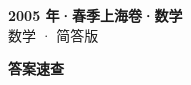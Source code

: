 \documentclass[zihao=-4, a4paper]{ctexart}
\begin{document}
\begin{center}
  {\Large\bfseries 2005 年·春季上海卷·数学}\\[4pt]
  {\large 数学 · 简答版}
\end{center}
\medskip
{}

\clearpage
{}
\begin{center}{\Large\bfseries 答案速查}\end{center}
\medskip

\end{document}
